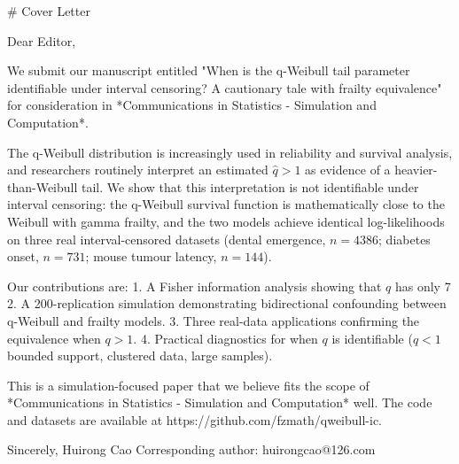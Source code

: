 # Cover Letter

Dear Editor,

We submit our manuscript entitled "When is the q-Weibull tail parameter identifiable under interval censoring? A cautionary tale with frailty equivalence" for consideration in *Communications in Statistics - Simulation and Computation*.

The q-Weibull distribution is increasingly used in reliability and survival analysis, and researchers routinely interpret an estimated $\hat q>1$ as evidence of a heavier-than-Weibull tail. We show that this interpretation is not identifiable under interval censoring: the q-Weibull survival function is mathematically close to the Weibull with gamma frailty, and the two models achieve identical log-likelihoods on three real interval-censored datasets (dental emergence, $n=4386$; diabetes onset, $n=731$; mouse tumour latency, $n=144$).

Our contributions are:
1. A Fisher information analysis showing that $q$ has only 7%
2. A 200-replication simulation demonstrating bidirectional confounding between q-Weibull and frailty models.
3. Three real-data applications confirming the equivalence when $q>1$.
4. Practical diagnostics for when $q$ is identifiable ($q<1$ bounded support, clustered data, large samples).

This is a simulation-focused paper that we believe fits the scope of *Communications in Statistics - Simulation and Computation* well. The code and datasets are available at https://github.com/fzmath/qweibull-ic.

Sincerely,
Huirong Cao
Corresponding author: huirongcao@126.com
